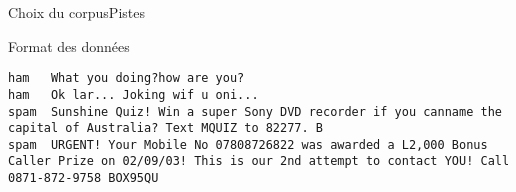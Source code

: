 \begin{frame}[containsverbatim]{Choix du corpus}{Pistes}
\begin{block}{Format des données}
\begin{verbatim}
ham   What you doing?how are you?
ham   Ok lar... Joking wif u oni...
spam  Sunshine Quiz! Win a super Sony DVD recorder if you canname the capital of Australia? Text MQUIZ to 82277. B
spam  URGENT! Your Mobile No 07808726822 was awarded a L2,000 Bonus Caller Prize on 02/09/03! This is our 2nd attempt to contact YOU! Call 0871-872-9758 BOX95QU
\end{verbatim}
\end{block}
\end{frame}